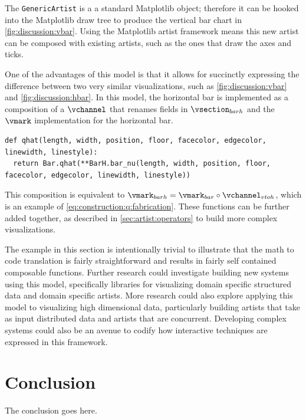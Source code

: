 \documentclass[10pt,journal,compsoc]{IEEEtran}
\theoremstyle{definition}
\theoremstyle{remark}
\begin{document}
The \texttt{GenericArtist} is a a standard Matplotlib object; therefore it can be hooked into the Matplotlib draw tree to produce the vertical bar chart in \autoref{fig:discussion:vbar}. Using the Matplotlib artist framework means this new artist can be composed with existing artists, such as the ones that draw the axes and ticks. 

One of the advantages of this model is that it allows for succinctly expressing the difference between two very similar visualizations, such as \autoref{fig:discussion:vbar} and \autoref{fig:discussion:hbar}. In this model, the horizontal bar is implemented as a composition of a $\vchannel$ that renames fields in $\vsection_{barh}$ and the $\vmark$ implementation for the horizontal bar.
\begin{verbatim}
def qhat(length, width, position, floor, facecolor, edgecolor, linewidth, linestyle):
  return Bar.qhat(**BarH.bar_nu(length, width, position, floor, facecolor, edgecolor, linewidth, linestyle))
\end{verbatim}
This composition is equivalent to $\vmark_{barh} = \vmark_{bar} \circ \vchannel_{vtoh}$, which is an example of \autoref{eq:construction:q:fabrication}. These functions can be further added together, as described in \autoref{sec:artist:operators} to build more complex visualizations. 

The example in this section is intentionally trivial to illustrate that the math to code translation is fairly straightforward and results in fairly self contained composable functions. Further research could investigate building new systems using this model, specifically libraries for visualizing domain specific structured data and domain specific artists. More research could also explore applying this model to visualizing high dimensional data, particularly building artists that take as input distributed data and artists that are concurrent. Developing complex systems could also be an avenue to codify how interactive techniques are expressed in this framework.







\section{Conclusion}
The conclusion goes here.


\appendices



\ifCLASSOPTIONcompsoc
\end{document}
